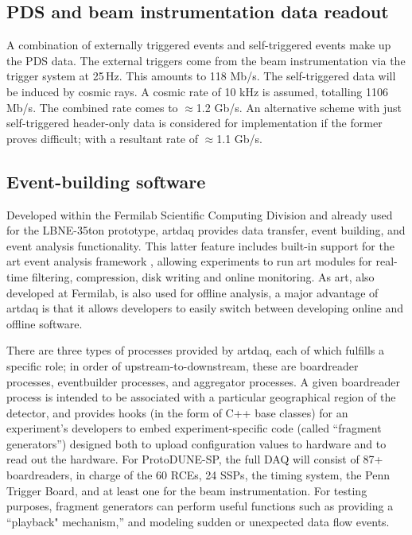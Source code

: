 \subsection{PDS and beam instrumentation data readout}
\label{subsec:pds-readout}

A combination of externally triggered events
and self-triggered events make up the PDS data.  The external triggers
come from the beam instrumentation via the trigger system at 25\,Hz.
This amounts to 118 Mb/s.  The self-triggered data
will be induced by cosmic rays.  A cosmic rate of 10 kHz is assumed,
totalling 1106 Mb/s.
The combined rate comes to $\approx$1.2 Gb/s.  An alternative scheme with
just self-triggered header-only data is considered for implementation if
the former proves difficult; with a resultant rate of $\approx$1.1 Gb/s.


\subsection{Event-building software }

Developed within the Fermilab Scientific Computing Division and
already used for the LBNE-35ton prototype, artdaq provides data
transfer, event building, and event analysis functionality. This
latter feature includes built-in support for the art event analysis
framework \cite{fnal:art}, allowing experiments to run art modules for real-time
filtering, compression, disk writing and online monitoring. As art,
also developed at Fermilab, is also used for offline analysis, a major
advantage of artdaq is that it allows developers to easily switch
between developing online and offline software.

There are three types of processes provided by artdaq, each of which
fulfills a specific role; in order of upstream-to-downstream, these
are boardreader processes, eventbuilder processes, and aggregator
processes. A given boardreader process is intended to be associated
with a particular geographical region of the detector, and provides
hooks (in the form of C++ base classes) for an experiment's developers
to embed experiment-specific code (called ``fragment generators'')
designed both to upload configuration values to hardware and to read
out the hardware. For ProtoDUNE-SP, the full DAQ will consist of 87+ 
boardreaders, in charge of the 60 RCEs, 24 SSPs, the timing system, 
the Penn Trigger Board, and at least one for the beam instrumentation.
For testing purposes, fragment generators can perform useful
functions such as providing a ``playback" mechanism,'' and modeling sudden or unexpected data flow events.


